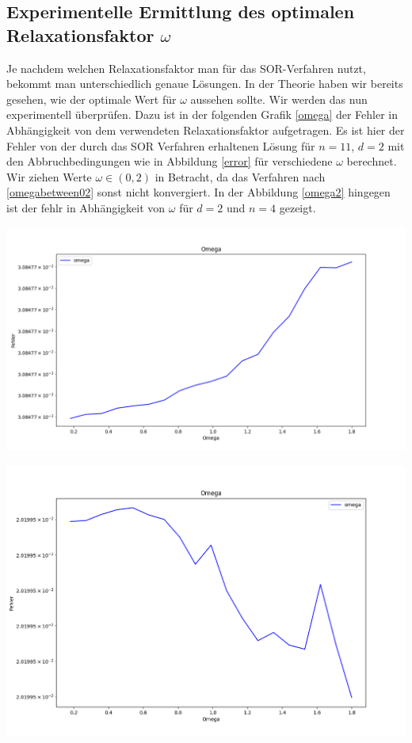 \documentclass[smallheadings]{scrartcl}
\theoremstyle{definition}
\begin{document}
\subsection{Experimentelle Ermittlung des optimalen Relaxationsfaktor $\omega$}
Je nachdem welchen Relaxationsfaktor man für das SOR-Verfahren nutzt,  bekommt man unterschiedlich genaue Lösungen.  In der Theorie haben wir bereits gesehen, wie der optimale Wert für $\omega$ aussehen sollte.  Wir werden das nun experimentell überprüfen.  Dazu ist in der folgenden Grafik \ref{omega}
 der Fehler in Abhängigkeit von dem verwendeten Relaxationsfaktor aufgetragen.  Es ist hier der Fehler von der durch das SOR Verfahren erhaltenen Lösung für $n=11$, $d=2$ mit den Abbruchbedingungen wie in Abbildung \ref{error} für verschiedene $\omega$ berechnet. Wir ziehen Werte $\omega \in (0,2)$ in Betracht, da das Verfahren nach \ref{omegabetween02} sonst nicht konvergiert. In der Abbildung \ref{omega2} hingegen ist der fehlr in Abhängigkeit von $\omega$ für $d=2$ und $n=4$ gezeigt.

\begin{minipage}{\textwidth}

 \centering
 \includegraphics[scale = 0.5]{Omega1}
 	\label{omega}

 \end{minipage}
 
\begin{minipage}{\textwidth}

 \centering
 \includegraphics[scale = 0.5]{Omega2}
 	\label{omega2}

 \end{minipage}
		 
\end{document}
